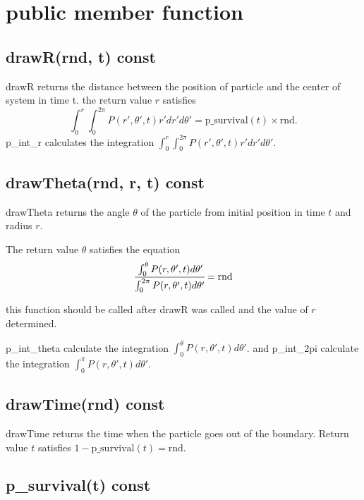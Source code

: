 \documentclass{article}
\begin{document}
\section{public member function}

\subsection{drawR(rnd, t) const}

drawR returns the distance between
the position of particle and the center of system in time t.
the return value $r$ satisfies
\begin{equation}
    \int^r_0 \int^{2\pi}_0 P(r', \theta', t) r'dr'd\theta' =
    \mathrm{p\_survival}(t) \times \mathrm{rnd}.
\end{equation}
p\_int\_r calculates the integration
$\int^r_0 \int^{2\pi}_0 P(r', \theta', t) r'dr'd\theta'$.

\subsection{drawTheta(rnd, r, t) const}

drawTheta returns the angle $\theta$ of the particle from initial position in time $t$ and radius $r$.

The return value $\theta$ satisfies the equation
\begin{equation}
    \cfrac{\int^\theta_0 P(r, \theta', t) d\theta'}
          {\int^{2\pi}_0 P(r, \theta', t) d\theta'} = \mathrm{rnd}
\end{equation}

this function should be called after drawR was called and
the value of $r$ determined.

p\_int\_theta calculate the integration
$\int^\theta_0 P(r, \theta', t) d\theta'$.
and p\_int\_2pi calculate the integration
$\int^\pi_0 P(r, \theta', t) d\theta'$.

\subsection{drawTime(rnd) const}

drawTime returns the time when the particle goes out of the boundary.
Return value $t$ satisfies $1 - \mathrm{p\_survival}(t) = \mathrm{rnd}$.

\subsection{p\_survival(t) const}
\end{document}
